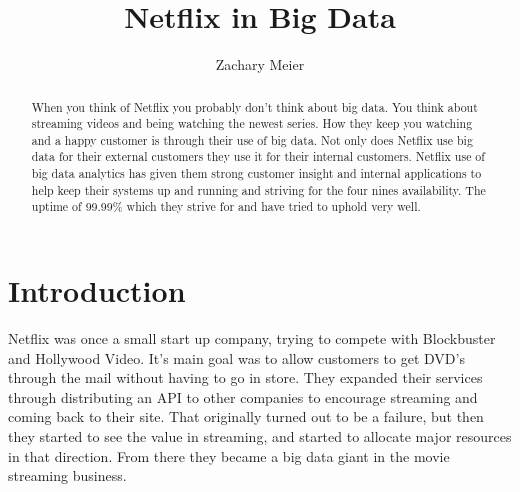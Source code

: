 \documentclass[sigconf]{acmart}
\begin{document}
\title{Netflix in Big Data}
\author{Zachary Meier}
\renewcommand{\shortauthors}{Z. Meier et al.}
\begin{abstract}
When you think of Netflix you probably don't think about big data.  You think about streaming videos and being watching the newest series.  How they keep you watching and a happy customer is through their use of big data.  Not only does Netflix use big data for their external customers they use it for their internal customers.  Netflix use of big data analytics has given them strong customer insight and internal applications to help keep their systems up and running and striving for the four nines availability.  The uptime of 99.99\% which they strive for and have tried to uphold very well.
\end{abstract}
\maketitle
\section{Introduction}
Netflix was once a small start up company, trying to compete with Blockbuster and Hollywood Video.  It's main goal was to allow customers to get DVD's through the mail without having to go in store.  They expanded their services through distributing an API to other companies to encourage streaming and coming back to their site.  That originally turned out to be a failure, but then they started to see the value in streaming, and started to allocate major resources in that direction.  From there they became a big data giant in the movie streaming business.
\end{document}
